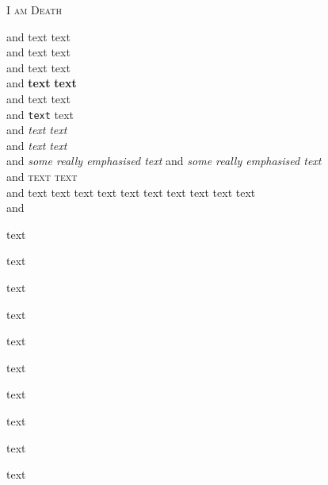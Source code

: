 \documentclass[a4paper,11pt]{article}
\begin{document}
    \textsc{I am Death}

    and \textmd{text} {\mdseries text} %
  \\and \textrm{text} {\rmfamily text} %
  \\and \textup{text} {\upshape text}  %
  \\and \textbf{text} {\bfseries text} %
  \\and \textsf{text} {\sffamily text} %
  \\and \texttt{text} {\ttfamily text} %
  \\and \textit{text} {\itshape text}  %
  \\and \textsl{text} {\slshape text}  %
  \\and \emph{some \emph{really} emphasised text} %
    and {\em some {\em really} emphasised text} %
  \\and \textsc{text} {\scshape text}  %
  \\and {\tiny         text} %
        {\scriptsize   text} %
        {\footnotesize text} %
        {\small        text}
        {\normalsize   text} %
        {\large        text}
        {\Large        text}
        {\LARGE        text}
        {\huge         text}
        {\Huge         text}
  \\and \begin{tiny}        text\end{tiny}
        \begin{scriptsize}  text\end{scriptsize}
        \begin{footnotesize}text\end{footnotesize}
        \begin{small}       text\end{small}
        \begin{normalsize}  text\end{normalsize}
        \begin{large}       text\end{large}
        \begin{Large}       text\end{Large}
        \begin{LARGE}       text\end{LARGE}
        \begin{huge}        text\end{huge}
        \begin{Huge}        text\end{Huge}
\end{document}
